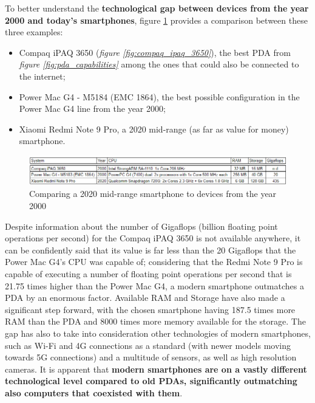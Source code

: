 To better understand the \textbf{technological gap between devices from the year 2000 and today's smartphones}, {figure \ref{fig:three_systems_comparison}} provides a comparison between these three examples:
\begin{itemize}
    \item Compaq iPAQ 3650 (\textit{figure \ref{fig:compaq_ipaq_3650}}), the best PDA from \textit{figure \ref{fig:pda_capabilities}} among the ones that could also be connected to the internet;
    \item Power Mac G4 - M5184 (EMC 1864), the best possible configuration in the Power Mac G4 line from the year 2000;
    \item Xiaomi Redmi Note 9 Pro, a 2020 mid-range (as far as value for money) smartphone.
\end{itemize}
\vspace*{20mm}

\begin{figure}[!ht]
    \centering
    \includegraphics[scale=0.88]{document/chapters/chapter_1/images/three_systems_comparison.png}
    \caption{Comparing a 2020 mid-range smartphone to devices from the year 2000}
    \label{fig:three_systems_comparison}
\end{figure}

Despite information about the number of Gigaflops (billion floating point operations per second) for the Compaq iPAQ 3650 is not available anywhere, it can be confidently said that its value is far less than the 20 Gigaflops that the Power Mac G4's CPU was capable of; considering that the Redmi Note 9 Pro is capable of executing a number of floating point operations per second that is 21.75 times higher than the Power Mac G4, a modern smartphone outmatches a PDA by an enormous factor. Available RAM and Storage have also made a significant step forward, with the chosen smartphone having 187.5 times more RAM than the PDA and 8000 times more memory available for the storage. The gap has also to take into consideration other technologies of modern smartphones, such as Wi-Fi and 4G connections as a standard (with newer models moving towards 5G connections) and a multitude of sensors, as well as high resolution cameras. 
It is apparent that \textbf{modern smartphones are on a vastly different technological level compared to old PDAs, significantly outmatching also computers that coexisted with them}.
